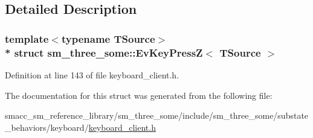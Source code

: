 \subsection{Detailed Description}
\subsubsection*{template$<$typename T\+Source$>$\\*
struct sm\+\_\+three\+\_\+some\+::\+Ev\+Key\+Press\+Z$<$ T\+Source $>$}



Definition at line 143 of file keyboard\+\_\+client.\+h.



The documentation for this struct was generated from the following file\+:\begin{DoxyCompactItemize}
\item 
smacc\+\_\+sm\+\_\+reference\+\_\+library/sm\+\_\+three\+\_\+some/include/sm\+\_\+three\+\_\+some/substate\+\_\+behaviors/keyboard/\hyperlink{keyboard__client_8h}{keyboard\+\_\+client.\+h}\end{DoxyCompactItemize}

